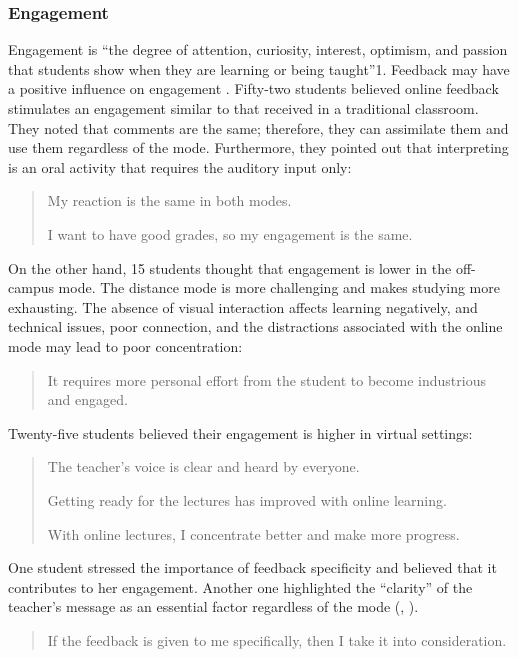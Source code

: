 \documentclass[english]{textolivre}
\begin{document}
\subsubsection{Engagement}
Engagement is “the degree of attention, curiosity, interest, optimism, and passion that students show when they are learning or being taught”1. Feedback may have a positive influence on engagement \cite[p. 30]{ogange_student_2018}. Fifty-two students believed online feedback stimulates an engagement similar to that received in a traditional classroom. They noted that comments are the same; therefore, they can assimilate them and use them regardless of the mode. Furthermore, they pointed out that interpreting is an oral activity that requires the auditory input only:

\begin{quote}
    My reaction is the same in both modes.
    
I want to have good grades, so my engagement is the same.
\end{quote}

On the other hand, 15 students thought that engagement is lower in the off-campus mode. The distance mode is more challenging and makes studying more exhausting. The absence of visual interaction affects learning negatively, and technical issues, poor connection, and the distractions associated with the online mode may lead to poor concentration:

\begin{quote}
    It requires more personal effort from the student to become industrious and engaged.
\end{quote}

Twenty-five students believed their engagement is higher in virtual settings:

\begin{quote}
    The teacher’s voice is clear and heard by everyone.
    
Getting ready for the lectures has improved with online learning.

With online lectures, I concentrate better and make more progress.
\end{quote}

One student stressed the importance of feedback specificity and believed that it contributes to her engagement. Another one highlighted the “clarity” of the teacher’s message as an essential factor regardless of the mode (, ).

\begin{quote}
    If the feedback is given to me specifically, then I take it into consideration.
\end{quote}
\end{document}
